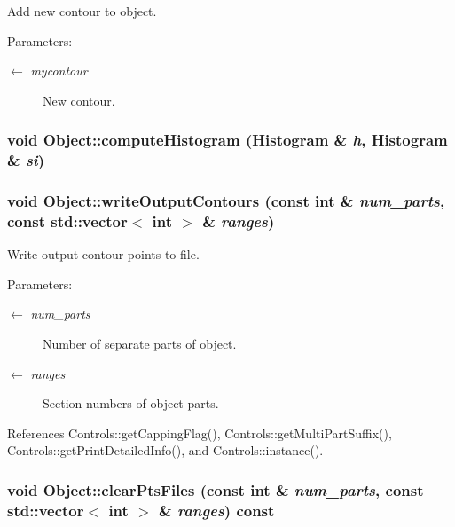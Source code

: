 Add new contour to object. \begin{Desc}
\item[Parameters:]
\begin{description}
\item[\mbox{$\leftarrow$} {\em mycontour}]New contour. \end{description}
\end{Desc}
\hypertarget{classObject_ec722906474791fe7ed7f738a5ae14b0}{
\subsubsection[computeHistogram]{\setlength{\rightskip}{0pt plus 5cm}void Object::computeHistogram ({\bf Histogram} \& {\em h}, \/  {\bf Histogram} \& {\em si})}}
\label{classObject_ec722906474791fe7ed7f738a5ae14b0}


\hypertarget{classObject_823588fd0be248ca9b7e1412d2d14931}{
\subsubsection[writeOutputContours]{\setlength{\rightskip}{0pt plus 5cm}void Object::writeOutputContours (const int \& {\em num\_\-parts}, \/  const std::vector$<$ int $>$ \& {\em ranges})}}
\label{classObject_823588fd0be248ca9b7e1412d2d14931}


Write output contour points to file. \begin{Desc}
\item[Parameters:]
\begin{description}
\item[\mbox{$\leftarrow$} {\em num\_\-parts}]Number of separate parts of object. \item[\mbox{$\leftarrow$} {\em ranges}]Section numbers of object parts. \end{description}
\end{Desc}


References Controls::getCappingFlag(), Controls::getMultiPartSuffix(), Controls::getPrintDetailedInfo(), and Controls::instance().\hypertarget{classObject_025155f5287bdcac93487ad439292e5d}{
\subsubsection[clearPtsFiles]{\setlength{\rightskip}{0pt plus 5cm}void Object::clearPtsFiles (const int \& {\em num\_\-parts}, \/  const std::vector$<$ int $>$ \& {\em ranges}) const}}
\label{classObject_025155f5287bdcac93487ad439292e5d}


